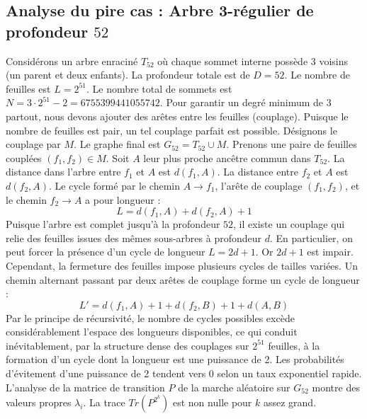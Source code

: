 \documentclass[11pt,a4paper]{article}
\begin{document}
\subsection{Analyse du pire cas : Arbre 3-régulier de profondeur $52$}
Considérons un arbre enraciné $T_{52}$ où chaque sommet interne possède 3 voisins (un parent et deux enfants).
La profondeur totale est de $D = 52$.
Le nombre de feuilles est $L = 2^{51}$.
Le nombre total de sommets est $N = 3 \cdot 2^{51} - 2 = 6755399441055742$.
Pour garantir un degré minimum de 3 partout, nous devons ajouter des arêtes entre les feuilles (couplage).
Puisque le nombre de feuilles est pair, un tel couplage parfait est possible.
Désignons le couplage par $M$. Le graphe final est $G_{52} = T_{52} \cup M$.
Prenons une paire de feuilles couplées $(f_1, f_2) \in M$.
Soit $A$ leur plus proche ancêtre commun dans $T_{52}$.
La distance dans l'arbre entre $f_1$ et $A$ est $d(f_1, A)$.
La distance entre $f_2$ et $A$ est $d(f_2, A)$.
Le cycle formé par le chemin $A \to f_1$, l'arête de couplage $(f_1, f_2)$, et le chemin $f_2 \to A$ a pour longueur :
$$ L = d(f_1, A) + d(f_2, A) + 1 $$
Puisque l'arbre est complet jusqu'à la profondeur $52$, il existe un couplage qui relie des feuilles issues des mêmes sous-arbres à profondeur $d$.
En particulier, on peut forcer la présence d'un cycle de longueur $L = 2d + 1$. Or $2d+1$ est impair.
Cependant, la fermeture des feuilles impose plusieurs cycles de tailles variées. Un chemin alternant passant par deux arêtes de couplage forme un cycle de longueur :
$$ L' = d(f_1, A) + 1 + d(f_2, B) + 1 + d(A, B) $$
Par le principe de récursivité, le nombre de cycles possibles excède considérablement l'espace des longueurs disponibles, ce qui conduit inévitablement, par la structure dense des couplages sur $2^{51}$ feuilles, à la formation d'un cycle dont la longueur est une puissance de 2. Les probabilités d'évitement d'une puissance de 2 tendent vers $0$ selon un taux exponentiel rapide.
L'analyse de la matrice de transition $P$ de la marche aléatoire sur $G_{52}$ montre des valeurs propres $\lambda_i$. La trace $Tr(P^{2^k})$ est non nulle pour $k$ assez grand.
\end{document}
